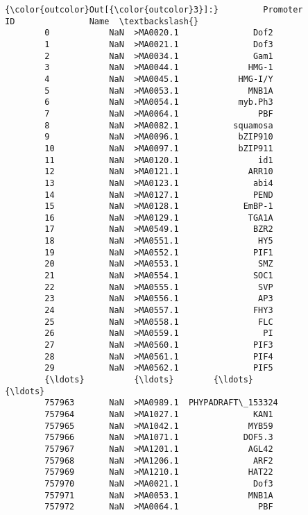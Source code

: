 \documentclass[11pt]{article}
\begin{document}
\begin{Verbatim}[commandchars=\\\{\}]
{\color{outcolor}Out[{\color{outcolor}3}]:}         Promoter         ID               Name  \textbackslash{}
        0            NaN  >MA0020.1               Dof2   
        1            NaN  >MA0021.1               Dof3   
        2            NaN  >MA0034.1               Gam1   
        3            NaN  >MA0044.1              HMG-1   
        4            NaN  >MA0045.1            HMG-I/Y   
        5            NaN  >MA0053.1              MNB1A   
        6            NaN  >MA0054.1            myb.Ph3   
        7            NaN  >MA0064.1                PBF   
        8            NaN  >MA0082.1           squamosa   
        9            NaN  >MA0096.1            bZIP910   
        10           NaN  >MA0097.1            bZIP911   
        11           NaN  >MA0120.1                id1   
        12           NaN  >MA0121.1              ARR10   
        13           NaN  >MA0123.1               abi4   
        14           NaN  >MA0127.1               PEND   
        15           NaN  >MA0128.1             EmBP-1   
        16           NaN  >MA0129.1              TGA1A   
        17           NaN  >MA0549.1               BZR2   
        18           NaN  >MA0551.1                HY5   
        19           NaN  >MA0552.1               PIF1   
        20           NaN  >MA0553.1                SMZ   
        21           NaN  >MA0554.1               SOC1   
        22           NaN  >MA0555.1                SVP   
        23           NaN  >MA0556.1                AP3   
        24           NaN  >MA0557.1               FHY3   
        25           NaN  >MA0558.1                FLC   
        26           NaN  >MA0559.1                 PI   
        27           NaN  >MA0560.1               PIF3   
        28           NaN  >MA0561.1               PIF4   
        29           NaN  >MA0562.1               PIF5   
        {\ldots}          {\ldots}        {\ldots}                {\ldots}   
        757963       NaN  >MA0989.1  PHYPADRAFT\_153324   
        757964       NaN  >MA1027.1               KAN1   
        757965       NaN  >MA1042.1              MYB59   
        757966       NaN  >MA1071.1             DOF5.3   
        757967       NaN  >MA1201.1              AGL42   
        757968       NaN  >MA1206.1               ARF2   
        757969       NaN  >MA1210.1              HAT22   
        757970       NaN  >MA0021.1               Dof3   
        757971       NaN  >MA0053.1              MNB1A   
        757972       NaN  >MA0064.1                PBF   

\end{Verbatim}
\end{document}
